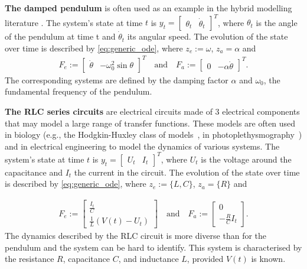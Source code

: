 \textbf{The damped pendulum} is often used as an example in the hybrid modelling literature \citep{APHYNITY, HVAE}. The system's state at time $t$ is $y_t = \begin{bmatrix}\theta_t & \dot \theta_t\end{bmatrix}^T$, where $\theta_t$ is the angle of the pendulum at time t and $\dot \theta_t$ its angular speed. The evolution of the state over time is described by \eqref{eq:generic_ode}, where $z_e:=\omega$, $z_a=\alpha$ and
\begin{align}
    F_e := \begin{bmatrix}\dot \theta &  -\omega_0^2 \sin \theta   \end{bmatrix}^T \quad \text{and} \quad F_a := \begin{bmatrix}0 &  -\alpha \dot \theta \end{bmatrix}^T.
\end{align}
The corresponding systems are defined by the damping factor $\alpha$ and $\omega_0$, the fundamental frequency of the pendulum.

\textbf{The RLC series circuits} are electrical circuits made of 3 electrical components that may model a large range of transfer functions. These models are often used in biology (e.g., the Hodgkin-Huxley class of models~\citep{hh-model}, in photoplethysmography~\citep{ppg-model}) and in electrical engineering to model the dynamics of various systems. The system's state at time $t$ is $y_t = \begin{bmatrix}U_t & I_t\end{bmatrix}^T$, where $U_t$ is the voltage around the capacitance and $I_t$ the current in the circuit. The evolution of the state over time is described by \eqref{eq:generic_ode}, where $z_e:=\{L, C\}$, $z_a= \{R\}$ and

\begin{align}
    F_e := \begin{bmatrix}\frac{I_t}{C} \\ \frac{1}{L} (V(t) - U_t) \end{bmatrix} \quad \text{and} \quad F_a := \begin{bmatrix}0 \\- \frac{R}{C}I_t\end{bmatrix}.
\end{align} The dynamics described by the RLC circuit is more diverse than for the pendulum and the system can be hard to identify. This system is characterised by the resistance $R$, capacitance $C$, and inductance $L$, provided $V(t)$ is known.

